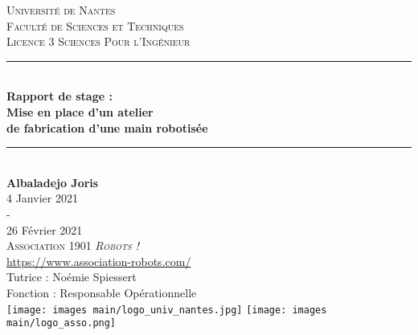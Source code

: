 \documentclass[12pt,titlepage]{article}
\numberwithin{figure}{subsubsection} %
\numberwithin{table}{subsubsection}
\begin{document}
\begin{titlepage}
\newcommand{\HRule}{\rule{\linewidth}{0.5mm}}
\center
\textsc{\LARGE
Université de Nantes\\[0.1cm]
Faculté de Sciences et Techniques\\[0.4cm]
Licence 3 Sciences Pour l'Ingénieur
} \\[0.6cm]
\HRule \\[0.4cm]
{ \huge \bfseries Rapport de stage :\\
                Mise en place d'un atelier\\
                de fabrication d'une main robotisée }\\[0.4cm]
\HRule \\[1.5cm]
\textbf{\LARGE Albaladejo Joris}
\\[0.5cm]
\Large 4 Janvier 2021\\
    -\\
    26 Février 2021 \\ [0.5cm]

\textsc{\LARGE Association 1901 \textit{Robots !}}\\
             \url{https://www.association-robots.com/}\\[1cm]
             \LARGE Tutrice : \LARGE Noémie Spiessert\\
             \LARGE Fonction : Responsable Opérationnelle\\[1cm]
             \RaggedRight
             \texttt{[image: images main/logo\_univ\_nantes.jpg]}
             \hspace{2cm}
             \texttt{[image: images main/logo\_asso.png]}
\end{titlepage}




\tableofcontents

\newpage

\listoffigures

\newpage

\listoftables

\newpage

\end{document}

